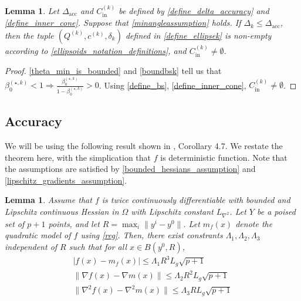 \documentclass{article}
\newtheorem{lemma}[theorem]{Lemma}
\theoremstyle{case}
\numberwithin{theorem}{subsection}
\newcommand{\bsk}{{\beta_0^{(\star, k)}}}
\newcommand{\ck}{{c^{(k)}}}
\newcommand{\dacc}{{\Delta_{\textrm{acc}}}}
\newcommand{\dk}{\Delta_k}
\newcommand{\fcki}{{C^{(k)}_{\textrm{in}}}}
\newcommand{\gradf}{\nabla f}
\newcommand{\liphess}{{L_{\nabla^2}}}
\newcommand{\qk}{{Q^{(k)}}}
\newcommand{\sdk}{{\delta_k}}
\begin{document}
\begin{lemma}
\label{sampletrk_is_nonempty}
Let $\dacc$ and $\fcki$ be defined by \cref{define_delta_accuracy} and \cref{define_inner_cone}.
Suppose that \cref{minangleassumption} holds.
If $\dk \le \dacc$, then the tuple $(\qk, \ck, \sdk)$ defined in \cref{define_ellipsek}
is non-empty according to \cref{ellipsoids_notation_definitions}, and $\fcki \ne \emptyset$.
\end{lemma}
\begin{proof}
\cref{theta_min_is_bounded} and \cref{boundbsk} tell us that $\bsk < 1 \Longrightarrow \frac{\bsk}{1 - \bsk} > 0$.
Using \cref{define_bs}, \cref{define_inner_cone},
$\fcki \ne \emptyset$.
\end{proof}


\subsection{Accuracy}
\label{ellipsoidal_lambda}

We will be using the following result shown in \cite{BillupsLarson2013}, Corollary 4.7.
We restate the theorem here, with the simplication that $f$ is deterministic function.
Note that the assumptions are satisfied by \cref{bounded_hessians_assumption} and \cref{lipschitz_gradients_assumption}.

\begin{lemma}
\label{change_radius} 
Assume that $f$ is twice continuously differentiable with bounded and Lipschitz continuous Hessian in $\Omega$ with Lipschitz constant $\liphess$.
Let $Y$ be a poised set of $p + 1$ points, and let $R = \max_{i}\|y^i - y^0\|$.
Let $m_f(x)$ denote the quadratic model of $f$ using \cref{reg}.
Then, there exist constrants $\Lambda_1, \Lambda_2, \Lambda_3$ independent of $R$ such that for all $x \in B(y^0, R)$,
\begin{align*}
|f(x) - m_f(x)| \le \Lambda_1 R^3L_g \sqrt{p+1} \\
\|\gradf(x) - \nabla m(x)\| \le \Lambda_2R^2  L_g \sqrt{p+1} \\
\|\nabla^2 f(x) - \nabla^2 m(x)\| \le \Lambda_3  RL_g \sqrt{p+1}
\end{align*}
\end{lemma}
\end{document}

